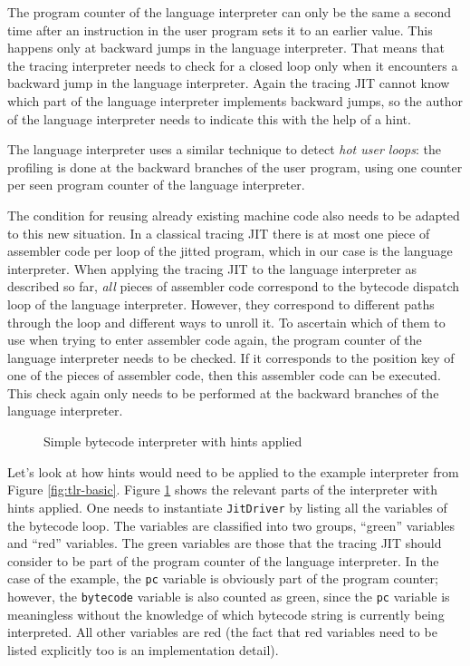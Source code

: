 \documentclass{sig-alternate}
\begin{document}
The program counter of the language interpreter can only be the same a
second time after an instruction in the user program sets it to an earlier
value. This happens only at backward jumps in the language interpreter. That
means that the tracing interpreter needs to check for a closed loop only when it
encounters a backward jump in the language interpreter. Again the tracing JIT
cannot know which part of the language interpreter implements backward jumps,
so the author of the language interpreter needs to indicate this with the help
of a hint.

The language interpreter uses a similar technique to detect \emph{hot user
loops}: the profiling is done at the backward branches of the user program,
using one counter per seen program counter of the language interpreter.

The condition for reusing already existing machine code also needs to be adapted to
this new situation. In a classical tracing JIT there is at most one piece of
assembler code per loop of the jitted program, which in our case is the language
interpreter. When applying the tracing JIT to the language interpreter as
described so far, \emph{all} pieces of assembler code correspond to the bytecode
dispatch loop of the language interpreter. However, they correspond to different
paths through the loop and different ways to unroll it. To ascertain which of them to use
when trying to enter assembler code again, the program counter of the language
interpreter needs to be checked. If it corresponds to the position key of one of
the pieces of assembler code, then this assembler code can be executed. This
check again only needs to be performed at the backward branches of the language
interpreter.

\begin{figure}

\caption{Simple bytecode interpreter with hints applied}
\label{fig:tlr-full}
\end{figure}

Let's look at how hints would need to be applied to the example interpreter
from Figure \ref{fig:tlr-basic}. Figure \ref{fig:tlr-full} shows the relevant
parts of the interpreter with hints applied.  One needs to instantiate
\texttt{JitDriver} by listing all the variables of the bytecode loop.
The variables are classified into two groups, ``green'' variables and ``red''
variables. The green variables are those that the tracing JIT should consider to
be part of the program counter of the language interpreter. In the case of the
example, the \texttt{pc} variable is obviously part of the program counter;
however, the \texttt{bytecode} variable is also counted as green, since the
\texttt{pc} variable is meaningless without the knowledge of which bytecode
string is currently being interpreted. All other variables are red (the fact
that red variables need to be listed explicitly too is an implementation
detail).
\end{document}
